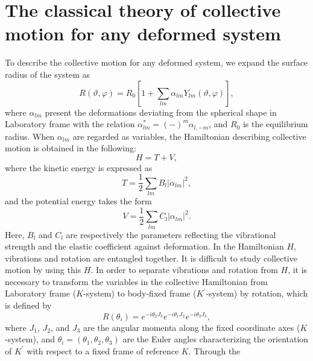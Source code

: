 \documentclass[twocolumn,prc,showpacs,preprintnumbers,superscriptaddress,floatfix]{revtex4}
\begin{document}
\section{The classical theory of collective motion for any deformed system}

To describe the collective motion for any deformed system, we expand the
surface radius of the system as
\begin{equation}
R\left( \vartheta ,\varphi \right) =R_{0}\left[ 1+\sum_{lm}\alpha
_{lm}Y_{lm}\left( \vartheta ,\varphi \right) \right] ,  \label{radius}
\end{equation}%
where $\alpha _{lm}$ present the deformations deviating from the spherical
shape in Laboratory frame with the relation $\alpha _{lm}^{\ast }=\left(
-\right) ^{m}\alpha _{l,-m}$, and $R_{0}$ is the equilibrium radius. When $%
\alpha _{lm}$ are regarded as variables, the Hamiltonian describing
collective motion is obtained in the following:
\begin{equation}
H=T+V,  \label{hamilton}
\end{equation}%
where the kinetic energy is expressed as
\begin{equation}
T=\frac{1}{2}\sum_{lm}B_{l}\left\vert \dot{\alpha}_{lm}\right\vert ^{2},
\label{kinetic}
\end{equation}%
and the potential energy takes the form
\begin{equation}
V=\frac{1}{2}\sum_{lm}C_{l}\left\vert \alpha _{lm}\right\vert ^{2}.
\label{potential}
\end{equation}%
Here, $B_{l}$ and $C_{l}$ are respectively the parameters reflecting the
vibrational strength and the elastic coefficient against deformation. In the
Hamiltonian $H$, vibrations and rotation are entangled together. It is
difficult to study collective motion by using this $H$. In order to separate
vibrations and rotation from $H$, it is necessary to transform the variables
in the collective Hamiltonian from Laboratory frame ($K$-system) to
body-fixed frame ($K^{\prime }$-system) by rotation, which is defined by
\begin{equation}
R(\theta _{i})={e^{-i\theta _{2}J_{3}}e^{-i\theta _{1}J_{2}}e^{-i\theta
_{3}J_{3}},}  \label{rotation}
\end{equation}%
where $J_{1}$, $J_{2}$, and $J_{3}$ are the angular momenta along the fixed
coordinate axes ($K$-system), and $\theta _{i}=(\theta _{1},\theta
_{2},\theta _{3})$ are the Euler angles characterizing the orientation of $%
K^{\prime }$ with respect to a fixed frame of reference $K$. Through the
\end{document}
